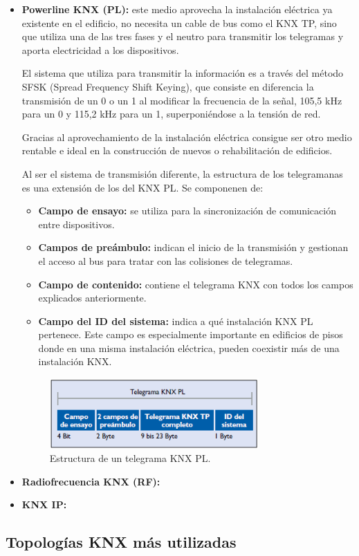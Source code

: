 \begin{itemize}
    \item \textbf{Powerline KNX (PL):} este medio aprovecha la instalación eléctrica ya existente en el edificio, no necesita un cable de bus como el KNX TP, sino que utiliza una de las tres fases y el neutro para transmitir los telegramas y aporta electricidad a los dispositivos.

    El sistema que utiliza para transmitir la información es a través del método SFSK (Spread Frequency Shift Keying), que consiste en diferencia la transmisión de un 0 o un 1 al modificar la frecuencia de la señal, 105,5 kHz para un 0 y 115,2 kHz para un 1, superponiéndose a la tensión de red.

    Gracias al aprovechamiento de la instalación eléctrica consigue ser otro medio rentable e ideal en la construcción de nuevos o rehabilitación de edificios.

    Al ser el sistema de transmisión diferente, la estructura de los telegramanas es una extensión de los del KNX PL. Se componenen de:
    \begin{itemize}
        \item \textbf{Campo de ensayo:} se utiliza para la sincronización de comunicación entre dispositivos.
        \item \textbf{Campos de preámbulo:} indican el inicio de la transmisión y gestionan el acceso al bus para tratar con las colisiones de telegramas.
        \item \textbf{Campo de contenido:} contiene el telegrama KNX con todos los campos explicados anteriormente.
        \item \textbf{Campo del ID del sistema:} indica a qué instalación KNX PL pertenece. Este campo es especialmente importante en edificios de pisos donde en una misma instalación eléctrica, pueden coexistir más de una instalación KNX.
    \end{itemize}
    \begin{figure}[h]
        \centering
        \includegraphics[width=8cm]{imagenes/capitulo2/Estructura de un telegrama KNX PL.png}
        \caption{Estructura de un telegrama KNX PL.}
        \label{fig:telegrama_KNX_PL}
    \end{figure}
    
    \item \textbf{Radiofrecuencia KNX (RF):}
    \item \textbf{KNX IP:}
\end{itemize}

\subsection{Topologías KNX más utilizadas}